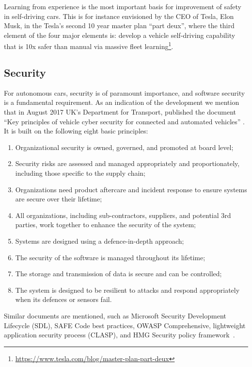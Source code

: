 Learning from experience is the most important basis for improvement of safety in self-driving cars. This is for instance envisioned by the CEO of Tesla, Elon Musk, in the Tesla's second 10 year master plan \enquote{part deux}, where the third element of the four major elements is: develop a vehicle self-driving capability that is 10x safer than manual via massive fleet learning\footnote{\url{https://www.tesla.com/blog/master-plan-part-deux}}.

\subsection{Security}
\label{sec:EAofTC:Security}

For autonomous cars, security is of paramount importance, and software security is a fundamental requirement. As an indication of the development we mention that in August 2017 UK's Department for Transport, published the document \enquote{Key principles of vehicle cyber security for connected and automated vehicles} \cite{DepartmentforTransportDfT2017}. It is built on the following eight basic principles:

\begin{enumerate}
\item Organizational security is owned, governed, and promoted at board level;
\item Security risks are assessed and managed appropriately and proportionately, including those specific to the supply chain;
\item Organizations need product aftercare and incident response to ensure systems are secure over their lifetime;
\item All organizations, including sub-contractors, suppliers, and potential 3rd parties, work together to enhance the security of the system;
\item Systems are designed using a defence-in-depth approach;
\item The security of the software is managed throughout its lifetime;
\item The storage and transmission of data is secure and can be controlled;
\item The system is designed to be resilient to attacks and respond appropriately when its defences or sensors fail.
\end{enumerate}

Similar documents are mentioned, such as Microsoft Security Development Lifecycle (SDL), SAFE Code best practices, OWASP Comprehensive, lightweight application security process (CLASP), and HMG Security policy framework~\cite{DepartmentforTransportDfT2017}.

